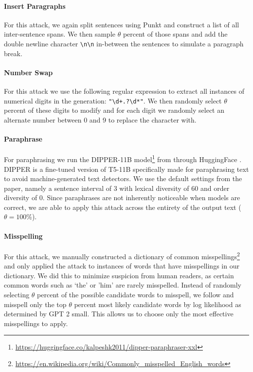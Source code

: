 \documentclass[11pt]{article}
\begin{document}
\paragraph{Insert Paragraphs} For this attack, we again split sentences using Punkt \cite{kiss-strunk-2006-unsupervised} and construct a list of all inter-sentence spans. We then sample $\theta$ percent of those spans and add the double newline character \texttt{\textbackslash n\textbackslash n} in-between the sentences to simulate a paragraph break.

\paragraph{Number Swap} For this attack we use the following regular expression to extract all instances of numerical digits in the generation: \texttt{"\textbackslash d+.?\textbackslash d*"}. We then randomly select $\theta$ percent of these digits to modify and for each digit we randomly select an alternate number between 0 and 9 to replace the character with.

\paragraph{Paraphrase} For paraphrasing we run the DIPPER-11B model\footnote{\url{https://huggingface.co/kalpeshk2011/dipper-paraphraser-xxl}} from \citet{krishna2023paraphrasing} through HuggingFace \cite{wolf2020huggingfaces}. DIPPER is a fine-tuned version of T5-11B \cite{raffel2020exploring} specifically made for paraphrasing text to avoid machine-generated text detectors. We use the default settings from the paper, namely a sentence interval of 3 with lexical diversity of 60 and order diversity of 0. Since paraphrases are not inherently noticeable when models are correct, we are able to apply this attack across the entirety of the output text ($\theta=100\%$).

\paragraph{Misspelling} For this attack, we manually constructed a dictionary of common misspellings\footnote{\url{https://en.wikipedia.org/wiki/Commonly_misspelled_English_words}} and only applied the attack to instances of words that have misspellings in our dictionary. We did this to minimize suspicion from human readers, as certain common words such as `the' or 'him' are rarely misspelled. Instead of randomly selecting $\theta$ percent of the possible candidate words to misspell, we follow \citet{gagiano-etal-2021-robustness} and misspell only the top $\theta$ percent most likely candidate words by log likelihood as determined by GPT 2 small. This allows us to choose only the most effective misspellings to apply.
\end{document}

